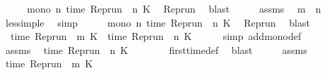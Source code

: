 \begin{isabellebody}
\isamarkupfalse%
\ {\isacharminus}\isanewline
\ \ \isamarkupfalse%
\ {\isacartoucheopen}mono\ {\isacharparenleft}{\isasymlambda}n{\isachardot}\ time\ {\isacharparenleft}Rep{\isacharunderscore}run\ {\isasymrho}\ n\ K{\isacharparenright}{\isacharparenright}{\isacartoucheclose}\ \isamarkupfalse%
\ Rep{\isacharunderscore}run\ \isamarkupfalse%
\ blast\isanewline
\ \ \isamarkupfalse%
\ \isamarkupfalse%
\ assms{\isacharparenleft}{}{\isacharparenright}\ \isamarkupfalse%
\ {\isacartoucheopen}m\ {\isasymle}\ n{\isacartoucheclose}\ \isamarkupfalse%
\ less{\isacharunderscore}imp{\isacharunderscore}le\ \isamarkupfalse%
\ simp\isanewline
\ \ \isamarkupfalse%
\ \isamarkupfalse%
\ {\isacartoucheopen}mono\ {\isacharparenleft}{\isasymlambda}n{\isachardot}\ time\ {\isacharparenleft}Rep{\isacharunderscore}run\ {\isasymrho}\ n\ K{\isacharparenright}{\isacharparenright}{\isacartoucheclose}\ \isamarkupfalse%
\ Rep{\isacharunderscore}run\ \isamarkupfalse%
\ blast\isanewline
\ \ \isamarkupfalse%
\ \isamarkupfalse%
\ \ {\isacartoucheopen}time\ {\isacharparenleft}{\isacharparenleft}Rep{\isacharunderscore}run\ {\isasymrho}{\isacharparenright}\ m\ K{\isacharparenright}\ {\isasymle}\ time\ {\isacharparenleft}{\isacharparenleft}Rep{\isacharunderscore}run\ {\isasymrho}{\isacharparenright}\ n\ K{\isacharparenright}{\isacartoucheclose}\isanewline
\ \ \ \ \isamarkupfalse%
\ {\isacharparenleft}simp\ add{\isacharcolon}mono{\isacharunderscore}def{\isacharparenright}\isanewline
\ \ \isamarkupfalse%
\ \isamarkupfalse%
\ assms{\isacharparenleft}{}{\isacharparenright}\ \isamarkupfalse%
\ {\isacartoucheopen}time\ {\isacharparenleft}{\isacharparenleft}Rep{\isacharunderscore}run\ {\isasymrho}{\isacharparenright}\ n\ K{\isacharparenright}\ {\isacharequal}\ {\isasymtau}{\isacartoucheclose}\isanewline
\ \ \ \ \isamarkupfalse%
\ first{\isacharunderscore}time{\isacharunderscore}def\ \isamarkupfalse%
\ blast\isanewline
\ \ \isamarkupfalse%
\ \isamarkupfalse%
\ assms\ \isamarkupfalse%
\ {\isacartoucheopen}time\ {\isacharparenleft}{\isacharparenleft}Rep{\isacharunderscore}run\ {\isasymrho}{\isacharparenright}\ m\ K{\isacharparenright}\ {\isasymnoteq}\ {\isasymtau}{\isacartoucheclose}\isanewline

\end{isabellebody}
